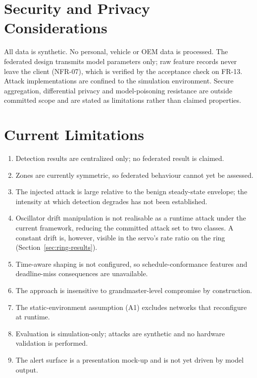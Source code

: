 \section{Security and Privacy Considerations}
All data is synthetic. No personal, vehicle or OEM data is processed. The federated
design transmits model parameters only; raw feature records never leave the client
(NFR-07), which is verified by the acceptance check on FR-13. Attack implementations
are confined to the simulation environment. Secure aggregation, differential privacy
and model-poisoning resistance are outside committed scope and are stated as
limitations rather than claimed properties.

\section{Current Limitations}
\label{sec:limitations}
\begin{enumerate}
  \item Detection results are centralized only; no federated result is claimed.
  \item Zones are currently symmetric, so federated behaviour cannot yet be assessed.
  \item The injected attack is large relative to the benign steady-state envelope; the
        intensity at which detection degrades has not been established.
  \item Oscillator drift manipulation is not realisable as a runtime attack under the
        current framework, reducing the committed attack set to two classes. A constant drift
        is, however, visible in the servo's rate ratio on the ring
        (Section~\ref{sec:ring-results}).
  \item Time-aware shaping is not configured, so schedule-conformance features and
        deadline-miss consequences are unavailable.
  \item The approach is insensitive to grandmaster-level compromise by construction.
  \item The static-environment assumption (A1) excludes networks that reconfigure at
        runtime.
  \item Evaluation is simulation-only; attacks are synthetic and no hardware
        validation is performed.
  \item The alert surface is a presentation mock-up and is not yet driven by model
        output.
\end{enumerate}

